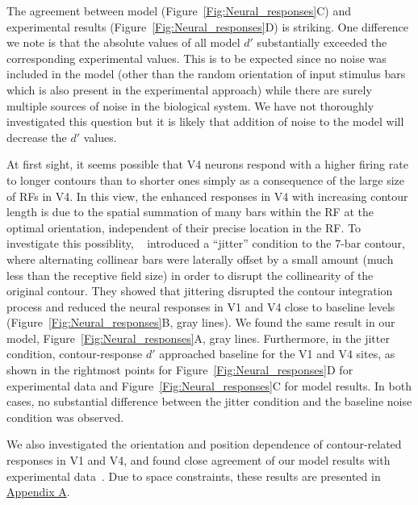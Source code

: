 The agreement between model (Figure~\ref{Fig:Neural_responses}C) and
experimental results (Figure~\ref{Fig:Neural_responses}D) is striking.
One difference we note is that the absolute values of all model $d'$
substantially exceeded the corresponding experimental values. 
This is to be expected since no noise was included in the model 
(other than the random orientation of input
stimulus bars which is also present in the experimental approach)
while there are surely multiple sources of noise in the biological
system. We have not thoroughly investigated this question but it is
likely that addition of noise to the model will decrease the $d'$
values.

At first sight, it seems possible that 
V4 neurons respond with a higher firing rate to longer contours than
to shorter ones simply as a consequence of 
the large size of RFs in V4. 
In this view, the enhanced responses in V4 with increasing contour
length is due to the spatial summation of many bars
within the RF at the optimal orientation,
independent of their precise location in the RF. 
To  investigate this possiblity,
~\cite{Chen_etal14} introduced a ``jitter'' condition to the 7-bar
contour, where alternating collinear bars were laterally offset 
by a small amount (much less than the receptive field size)
in order to disrupt the collinearity of the original contour. They
showed that jittering disrupted the 
contour integration process and reduced the neural responses in V1
and V4 close to baseline levels (Figure~\ref{Fig:Neural_responses}B,
gray lines). We found the same result in our model,
Figure~\ref{Fig:Neural_responses}A, gray lines.  Furthermore, in the
jitter condition, contour-response $d'$ approached baseline for the
V1 and V4 sites, as shown in the rightmost points for
Figure~\ref{Fig:Neural_responses}D for experimental data and
Figure~\ref{Fig:Neural_responses}C for model results. In both cases,
no substantial difference between the jitter condition and the
baseline noise condition was observed.

We also investigated the orientation and position dependence of
contour-related responses in V1 and V4, and found close agreement of
our model results with experimental data~\citep{Chen_etal14}. Due
to space constraints, these results are presented in \hyperref[sec:appendix_fig]{Appendix A}.

